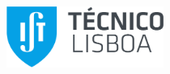
\thispagestyle {empty}

\vspace*{-12mm}
\hspace*{-12mm}
\includegraphics[height=20mm]{IST_A_CMYK_POS-crop.pdf}

